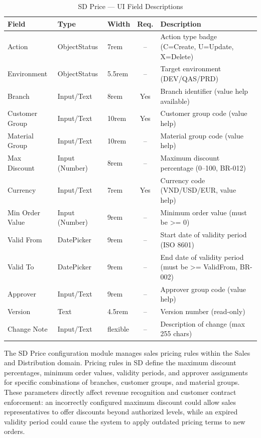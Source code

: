 \documentclass[12pt,a4paper]{report}
\begin{document}
\begin{table}[H]
\centering\small
\begin{tabularx}{\textwidth}{|l|l|l|c|X|}
  \hline
  \rowcolor{tableheadpeach}
  \textbf{Field} & \textbf{Type} & \textbf{Width} & \textbf{Req.} & \textbf{Description} \\ \hline
  Action & ObjectStatus & 7rem & -- & Action type badge (C=Create, U=Update, X=Delete) \\ \hline
  Environment & ObjectStatus & 5.5rem & -- & Target environment (DEV/QAS/PRD) \\ \hline
  Branch & Input/Text & 8rem & Yes & Branch identifier (value help available) \\ \hline
  Customer Group & Input/Text & 10rem & Yes & Customer group code (value help) \\ \hline
  Material Group & Input/Text & 10rem & -- & Material group code (value help) \\ \hline
  Max Discount & Input (Number) & 8rem & -- & Maximum discount percentage (0--100, BR-012) \\ \hline
  Currency & Input/Text & 7rem & Yes & Currency code (VND/USD/EUR, value help) \\ \hline
  Min Order Value & Input (Number) & 9rem & -- & Minimum order value (must be >= 0) \\ \hline
  Valid From & DatePicker & 9rem & -- & Start date of validity period (ISO 8601) \\ \hline
  Valid To & DatePicker & 9rem & -- & End date of validity period (must be >= ValidFrom, BR-002) \\ \hline
  Approver & Input/Text & 9rem & -- & Approver group code (value help) \\ \hline
  Version & Text & 4.5rem & -- & Version number (read-only) \\ \hline
  Change Note & Input/Text & flexible & -- & Description of change (max 255 chars) \\ \hline
\end{tabularx}
\caption{SD Price --- UI Field Descriptions}
\label{tab:ui-sd-fields}
\end{table}


The SD Price configuration module manages sales pricing rules within the Sales and Distribution domain. Pricing rules in SD define the maximum discount percentages, minimum order values, validity periods, and approver assignments for specific combinations of branches, customer groups, and material groups. These parameters directly affect revenue recognition and customer contract enforcement: an incorrectly configured maximum discount could allow sales representatives to offer discounts beyond authorized levels, while an expired validity period could cause the system to apply outdated pricing terms to new orders.
\end{document}
